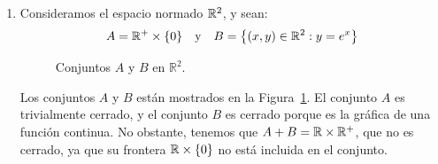 \begin{ejercicio}
\begin{enumerate}
\begin{itemize}
        Como $a + n \in \bb{Z}$, se deduce que $-(a + n) \in \bb{Z}$. No obstante, tenemos que:
        \begin{equation*}
            0 < \frac{1}{n+1} < 1
        \end{equation*}
        lo cual es una contradicción, ya que ningún número entero puede ser igual a un número estrictamente positivo menor que $1$. Por tanto, $0 \notin A + B$.
    \end{itemize}
    Por tanto, $A + B$ no es cerrado.
    \item Consideramos el espacio normado $\mathbb{R}^2$, y sean:
    \begin{equation*}
        A = \mathbb{R}^+ \times \{0\} \quad \text{y} \quad B = \left\{(x, y) \in \mathbb{R}^2 : y = e^x\right\}
    \end{equation*}
    \begin{figure}
        \centering
        \caption{Conjuntos $A$ y $B$ en $\mathbb{R}^2$.}
        \label{fig:conjuntos_A_B}
    \end{figure}
    Los conjuntos $A$ y $B$ están mostrados en la Figura~\ref{fig:conjuntos_A_B}. El conjunto $A$ es trivialmente cerrado, y el conjunto $B$ es cerrado porque es la gráfica de una función continua. No obstante, tenemos que $A + B=\mathbb{R} \times \mathbb{R}^+$, que no es cerrado, ya que su frontera $\mathbb{R} \times \{0\}$ no está incluida en el conjunto.
\end{enumerate}
\end{ejercicio}

